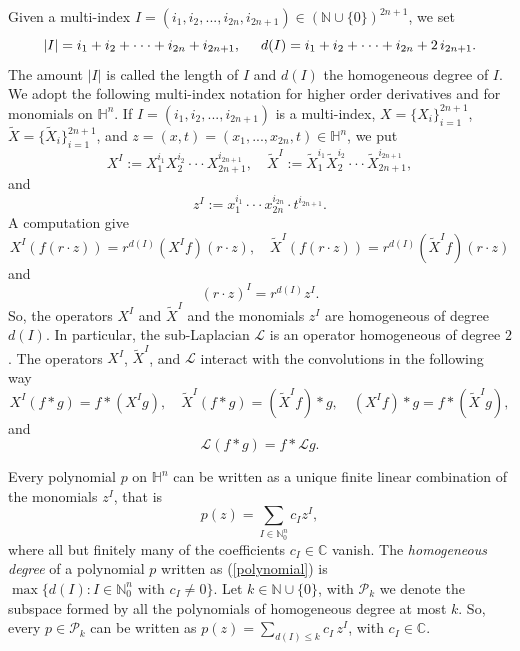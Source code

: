 \documentclass[reqno,10pt]{article}
\theoremstyle{definition}
\numberwithin{equation}{section}
\numberwithin{theorem}{section}
\begin{document}
Given a multi-index $I=(i_1,i_2, ..., i_{2n}, i_{2n+1}) \in (\mathbb{N} \cup \{ 0 \})^{2n+1}$, we set
\[
|I| = i_1 + i_2 + \cdot \cdot \cdot + i_{2n} + i_{2n+1}, \hspace{.5cm} d(I) = i_1 + i_2 + \cdot \cdot \cdot + i_{2n} + 2 \, i_{2n+1}.
\]
The amount $|I|$ is called the length of $I$ and $d(I)$ the homogeneous degree of $I$. We adopt the following multi-index notation for
higher order derivatives and for monomials on $\mathbb{H}^{n}$. If $I=(i_1, i_2, ..., i_{2n+1})$ is a multi-index, 
$X = \{ X_i \}_{i=1}^{2n+1}$, $\widetilde{X} =  \{ \widetilde{X}_{i} \}_{i=1}^{2n+1}$, and 
$z = (x,t) = (x_1, ..., x_{2n}, t) \in \mathbb{H}^{n}$, we put
\[
X^{I} := X_{1}^{i_1} X_{2}^{i_2} \cdot \cdot \cdot X_{2n+1}^{i_{2n+1}}, \,\,\,\,\,\, 
\widetilde{X}^{I} := \widetilde{X}_{1}^{i_1} \widetilde{X}_{2}^{i_2} \cdot \cdot \cdot \widetilde{X}_{2n+1}^{i_{2n+1}},
\]
and
\[
z^{I} := x_{1}^{i_1} \cdot \cdot \cdot x_{2n}^{i_{2n}} \cdot t^{i_{2n+1}}.
\]
A computation give
\[
X^{I}(f(r \cdot z)) = r^{d(I)} (X^{I}f)(r\cdot z), \,\,\,\,\,\, \widetilde{X}^{I}(f(r \cdot z)) = r^{d(I)} (\widetilde{X}^{I}f)(r\cdot z)
\]
and 
\[
(r\cdot z)^{I} = r^{d(I)} z^{I}.
\]
So, the operators $X^{I}$ and $\widetilde{X}^{I}$ and the monomials $z^{I}$ are homogeneous of degree $d(I)$. In particular, the 
sub-Laplacian $\mathcal{L}$ is an operator homogeneous of degree $2$. The operators $X^{I}$, $\widetilde{X}^{I}$, and $\mathcal{L}$  
interact with the convolutions in the following way
\[
X^{I}(f \ast g) = f \ast (X^{I}g), \,\,\,\,\,\, \widetilde{X}^{I}(f \ast g) = (\widetilde{X}^{I} f) \ast g, \,\,\,\,\,\,
(X^{I} f) \ast g = f \ast (\widetilde{X}^{I} g),
\]
and 
\[
\mathcal{L} (f \ast g) = f \ast \mathcal{L}g.
\]

Every polynomial $p$ on $\mathbb{H}^n$ can be written as a unique finite linear combination of the monomials $z^I$, that is
\begin{equation} \label{polynomial}
p(z) = \sum_{I \in \mathbb{N}_{0}^n} c_I z^I,
\end{equation}
where all but finitely many of the coefficients $c_I \in \mathbb{C}$ vanish. The \textit{homogeneous degree} of a polynomial $p$ written as 
(\ref{polynomial}) is $\max \{ d(I) : I \in \mathbb{N}_{0}^n \,\, \text{with} \,\, c_I \neq 0 \}$. Let $k \in \mathbb{N} \cup \{ 0 \}$, 
with $\mathcal{P}_{k}$ we denote the subspace formed by all the polynomials of homogeneous degree at most $k$. So, every 
$p \in \mathcal{P}_{k}$ can be written as $p(z) = \sum_{d(I) \leq k} c_I \, z^I$, with $c_I \in \mathbb{C}$.
\end{document}
